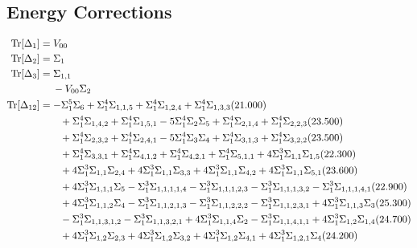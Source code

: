 \documentclass[12pt]{article}
\newcommand{\trdelta}[1]{\Tr[\Delta_{#1}]}
\begin{document}
\begin{landscape}
\section*{Energy Corrections}
\begin{align*}
    \trdelta{1} &= V_{00} \\
    \trdelta{2} &= \Sigma_1 \\
    \trdelta{3} &= \Sigma_{1,1} \\
        &\quad\; -V_{00}\Sigma_{2} \\
	\trdelta{12} &= -\Sigma_{1}^{5}\Sigma_{6}+\Sigma_{1}^{4}\Sigma_{1,1,5}+\Sigma_{1}^{4}\Sigma_{1,2,4}+\Sigma_{1}^{4}\Sigma_{1,3,3}(21.000) \\ 
		&\quad\quad +\Sigma_{1}^{4}\Sigma_{1,4,2}+\Sigma_{1}^{4}\Sigma_{1,5,1}-5\Sigma_{1}^{4}\Sigma_{2}\Sigma_{5}+\Sigma_{1}^{4}\Sigma_{2,1,4}+\Sigma_{1}^{4}\Sigma_{2,2,3}(23.500) \\ 
		&\quad\quad +\Sigma_{1}^{4}\Sigma_{2,3,2}+\Sigma_{1}^{4}\Sigma_{2,4,1}-5\Sigma_{1}^{4}\Sigma_{3}\Sigma_{4}+\Sigma_{1}^{4}\Sigma_{3,1,3}+\Sigma_{1}^{4}\Sigma_{3,2,2}(23.500) \\ 
		&\quad\quad +\Sigma_{1}^{4}\Sigma_{3,3,1}+\Sigma_{1}^{4}\Sigma_{4,1,2}+\Sigma_{1}^{4}\Sigma_{4,2,1}+\Sigma_{1}^{4}\Sigma_{5,1,1}+4\Sigma_{1}^{3}\Sigma_{1,1}\Sigma_{1,5}(22.300) \\ 
		&\quad\quad +4\Sigma_{1}^{3}\Sigma_{1,1}\Sigma_{2,4}+4\Sigma_{1}^{3}\Sigma_{1,1}\Sigma_{3,3}+4\Sigma_{1}^{3}\Sigma_{1,1}\Sigma_{4,2}+4\Sigma_{1}^{3}\Sigma_{1,1}\Sigma_{5,1}(23.600) \\ 
		&\quad\quad +4\Sigma_{1}^{3}\Sigma_{1,1,1}\Sigma_{5}-\Sigma_{1}^{3}\Sigma_{1,1,1,1,4}-\Sigma_{1}^{3}\Sigma_{1,1,1,2,3}-\Sigma_{1}^{3}\Sigma_{1,1,1,3,2}-\Sigma_{1}^{3}\Sigma_{1,1,1,4,1}(22.900) \\ 
		&\quad\quad +4\Sigma_{1}^{3}\Sigma_{1,1,2}\Sigma_{4}-\Sigma_{1}^{3}\Sigma_{1,1,2,1,3}-\Sigma_{1}^{3}\Sigma_{1,1,2,2,2}-\Sigma_{1}^{3}\Sigma_{1,1,2,3,1}+4\Sigma_{1}^{3}\Sigma_{1,1,3}\Sigma_{3}(25.300) \\ 
		&\quad\quad -\Sigma_{1}^{3}\Sigma_{1,1,3,1,2}-\Sigma_{1}^{3}\Sigma_{1,1,3,2,1}+4\Sigma_{1}^{3}\Sigma_{1,1,4}\Sigma_{2}-\Sigma_{1}^{3}\Sigma_{1,1,4,1,1}+4\Sigma_{1}^{3}\Sigma_{1,2}\Sigma_{1,4}(24.700) \\ 
		&\quad\quad +4\Sigma_{1}^{3}\Sigma_{1,2}\Sigma_{2,3}+4\Sigma_{1}^{3}\Sigma_{1,2}\Sigma_{3,2}+4\Sigma_{1}^{3}\Sigma_{1,2}\Sigma_{4,1}+4\Sigma_{1}^{3}\Sigma_{1,2,1}\Sigma_{4}(24.200) \\ 

\end{align*}
\end{landscape}
\end{document}
